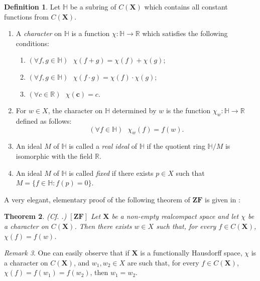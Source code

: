 \documentclass[12pt,twoside,leqno]{article}
\theoremstyle{plain}
\newtheorem{theorem}{Theorem}[section]
\theoremstyle{definition}
\newtheorem{definition}[theorem]{Definition}
\theoremstyle{remark}
\newtheorem{remark}[theorem]{Remark}
\begin{document}
\begin{definition}
	\label{s9:d1}
	Let $\mathbb{H}$ be a subring of $C(\mathbf{X})$ which contains all constant functions from $C(\mathbf{X})$.
	\begin{enumerate}
		\item[(a)] A \emph{character} on $\mathbb{H}$ is a function $\chi:\mathbb{H}\to\mathbb{R}$ which satisfies the following conditions:
		\begin{enumerate}
			\item[(i)] $(\forall f,g\in \mathbb{H})\text{ } \chi(f+g)=\chi(f)+\chi(g)$;
			\item[(ii)] $(\forall f,g\in \mathbb{H})\text{ } \chi(f\cdot g)=\chi(f)\cdot\chi(g)$;
			\item[(iii)] $(\forall c\in\mathbb{R})\text{ } \chi(\mathbf{c})=c$.
		\end{enumerate}
		\item[(b)] For $w\in X$, the character on $\mathbb{H}$ determined by $w$ is the function $\chi_w: \mathbb{H}\to\mathbb{R}$ defined as follows:
		$$(\forall f\in\mathbb{H})\text{ } \chi_w(f)=f(w).$$
		\item[(c)] An ideal $M$ of $\mathbb{H}$ is called a \emph{real ideal} of $\mathbb{H}$ if the quotient ring $\mathbb{H}/M$ is isomorphic with the field $\mathbb{R}$.
		\item[(d)] An ideal $M$ of $\mathbb{H}$ is called \emph{fixed} if there exists $p\in X$ such that $M=\{f\in\mathbb{H}: f(p)=0\}$.
	\end{enumerate}
\end{definition} 

A very elegant, elementary proof of the following theorem of $\mathbf{ZF}$  is given in \cite{bo}:

\begin{theorem} 
	\label{s9:t2}(Cf. \cite[Theorem 1]{bo}.) $[\mathbf{ZF}]$ Let $\mathbf{X}$ be a non-empty realcompact space and let $\chi$ be a character on $C(\mathbf{X})$. Then there exists $w\in X$ such that, for every $f\in C(\mathbf{X})$, $\chi(f)=f(w)$.
\end{theorem}

\begin{remark}
	\label{s9:r03}
	One can easily observe that if $\mathbf{X}$ is a functionally Hausdorff space, $\chi$ is a character on $C(\mathbf{X})$, and $w_1, w_2\in X$ are such that, for every $f\in C(\mathbf{X})$, $\chi(f)=f(w_1)=f(w_2)$, then $w_1=w_2$.
\end{remark}
\end{document}
